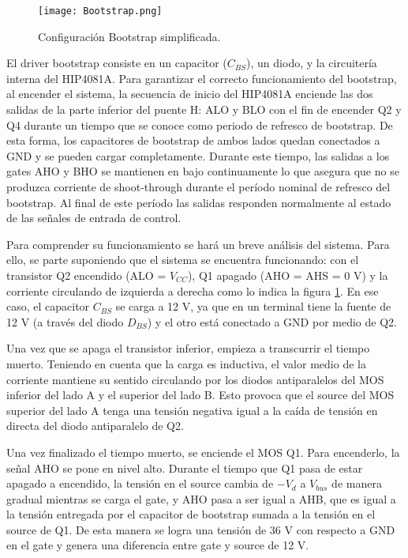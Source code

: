 \begin{figure}[H]
	\centering
	\texttt{[image: Bootstrap.png]}
	\caption{Configuración Bootstrap simplificada.}
	\label{fig:img_bootstrap}
\end{figure}

\noindent El driver bootstrap consiste en un capacitor ($C_{BS}$), un diodo, y la circuitería interna del HIP4081A. Para garantizar el correcto funcionamiento del bootstrap, al encender el sistema, la secuencia de inicio del HIP4081A enciende las dos salidas de la parte inferior del puente H: ALO y BLO con el fin de encender Q2 y Q4 durante un tiempo que se conoce como periodo de refresco de bootstrap. De esta forma, los capacitores de bootstrap de ambos lados quedan conectados a GND y se pueden cargar completamente. Durante este tiempo, las salidas a los gates AHO y BHO se mantienen en bajo continuamente lo que asegura que no se produzca corriente de shoot-through durante el período nominal de refresco del bootstrap. Al final de este período las salidas responden normalmente al estado de las señales de entrada de control.

\noindent Para comprender su funcionamiento se hará un breve análisis del sistema. Para ello, se parte suponiendo que el sistema se encuentra funcionando: con el transistor Q2 encendido (ALO = $V_{CC}$), Q1 apagado (AHO = AHS = 0 V) y la corriente circulando de izquierda a derecha como lo indica la figura \ref{fig:img_bootstrap}. En ese caso, el capacitor $C_{BS}$ se carga a 12 V, ya que en un terminal tiene la fuente de 12 V (a través del diodo $D_{BS}$) y el otro está conectado a GND por medio de Q2.

\noindent Una vez que se apaga el transistor inferior, empieza a transcurrir el tiempo muerto. Teniendo en cuenta que la carga es inductiva, el valor medio de la corriente mantiene su sentido circulando por los diodos antiparalelos del MOS inferior del lado A y el superior del lado B. Esto provoca que el source del MOS superior del lado A tenga una tensión negativa igual a la caída de tensión en directa del diodo antiparalelo de Q2. 

\noindent Una vez finalizado el tiempo muerto, se enciende el MOS Q1. Para encenderlo, la señal AHO se pone en nivel alto. Durante el tiempo que Q1 pasa de estar apagado a encendido, la tensión en el source cambia de $-V_d$ a $V_{bus}$ de manera gradual mientras se carga el gate, y AHO pasa a ser igual a AHB, que es igual a la tensión entregada por el capacitor de bootstrap sumada a la tensión en el source de Q1. De esta manera se logra una tensión de 36 V con respecto a GND en el gate y genera una diferencia entre gate y source de 12 V.

